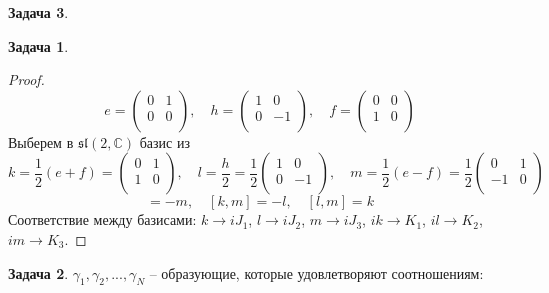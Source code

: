 \documentclass[12pt]{article}
\theoremstyle{definition}
\newtheorem{zad}{Задача}[section]
\begin{document}
\begin{zad}
\begin{itemize}
\begin{zad}
\begin{itemize}
\begin{proof}
\begin{equation}
            e=\left(
        \begin{array}{cc}
        0 & 1\\
        0 & 0\\
        \end{array}
        \right),\quad h=\left(
        \begin{array}{cc}
        1 & 0\\
        0 & -1\\
        \end{array}
        \right),\quad f=\left(
        \begin{array}{cc}
        0 & 0\\
        1 & 0\\
        \end{array}
        \right)
        \end{equation}
        Выберем в $\mathfrak{sl}(2,\mathbb{C})$ базис из
        \begin{equation*}
            k=\frac{1}{2}(e+f)=\left(
        \begin{array}{cc}
        0 & 1\\
        1 & 0\\
        \end{array}
        \right),\quad l=\frac{h}{2}=\frac{1}{2}\left(
        \begin{array}{cc}
        1 & 0\\
        0 & -1\\
        \end{array}
        \right),\quad m=\frac{1}{2}(e-f)=\frac{1}{2}\left(
        \begin{array}{cc}
        0 & 1\\
        -1 & 0\\
        \end{array}
        \right)
        \end{equation*}
        \begin{equation}
            [k,l]=-m,\quad [k,m]=-l,\quad [l,m]=k
        \end{equation}
        Соответствие между базисами: $k\rightarrow iJ_1$, $l\rightarrow iJ_2$, $m\rightarrow iJ_3$, $ik\rightarrow K_1$, $il\rightarrow K_2$, $im\rightarrow K_3$.
    \end{proof}
    \end{itemize}
    \end{zad}
    \begin{zad}
    $\gamma_1,\gamma_2,...,\gamma_N$ -- образующие, которые удовлетворяют соотношениям:

\end{zad}
\end{itemize}
\end{zad}
\end{document}
